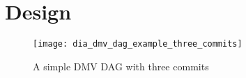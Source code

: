 \section{Design}

\begin{figure}[]
    \centering
    \texttt{[image: dia\_dmv\_dag\_example\_three\_commits]}
    \caption{A simple DMV DAG with three commits}
    \label{dia_dmv_dag_example_three_commits}
\end{figure}
